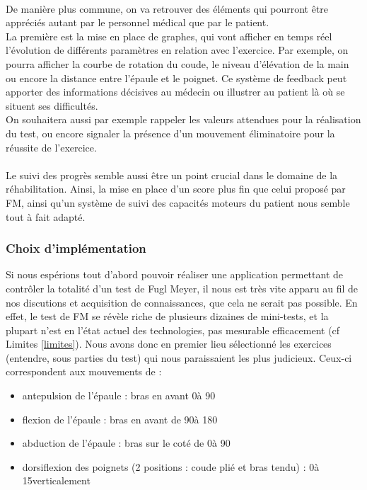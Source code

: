 \documentclass[french,12pt]{report}
\begin{document}
\paragraph{}
De manière plus commune, on va retrouver des éléments qui pourront être appréciés autant par le personnel médical que par 
le patient. \\
La première est la mise en place de graphes, qui vont afficher en temps réel l'évolution de différents paramètres en relation
avec l'exercice. Par exemple, on pourra afficher la courbe de rotation du coude, le niveau d'élévation de la main ou encore la
distance entre l'épaule et le poignet. Ce système de feedback peut apporter des informations décisives au médecin ou
illustrer au patient là où se situent ses difficultés.\\
On souhaitera aussi par exemple rappeler les valeurs attendues pour la réalisation du test, ou encore signaler la présence
d'un mouvement éliminatoire pour la réussite de l'exercice.

\paragraph{}
Le suivi des progrès semble aussi être un point crucial dans le domaine de la réhabilitation. Ainsi, la mise en place d'un score
plus fin que celui proposé par FM, ainsi qu'un système de suivi des capacités moteurs du patient nous semble tout à fait
adapté.

		
		
\subsubsection{Choix d'implémentation}
Si nous espérions tout d'abord pouvoir réaliser une application permettant de contrôler la totalité d'un test de Fugl Meyer, il nous
est très vite apparu au fil de nos discutions et acquisition de connaissances, que cela ne serait pas possible. En effet, le test de FM
se révèle riche de plusieurs dizaines de mini-tests, et la plupart n'est en l'état actuel des technologies, pas mesurable efficacement (cf Limites \ref{limites}). Nous avons donc en premier lieu sélectionné les exercices (entendre, sous parties du test)
qui nous paraissaient les plus judicieux. Ceux-ci correspondent aux mouvements de :
\begin{itemize}
\item antepulsion de l'épaule : bras en avant 0\degre à 90\degre
\item flexion de l'épaule : bras en avant de 90\degre à 180\degre
\item abduction de l'épaule : bras sur le coté de 0\degre à 90\degre
\item dorsiflexion des poignets (2 positions : coude plié et bras tendu) : 0\degre à 15\degre verticalement
\end{itemize}
\end{document}
